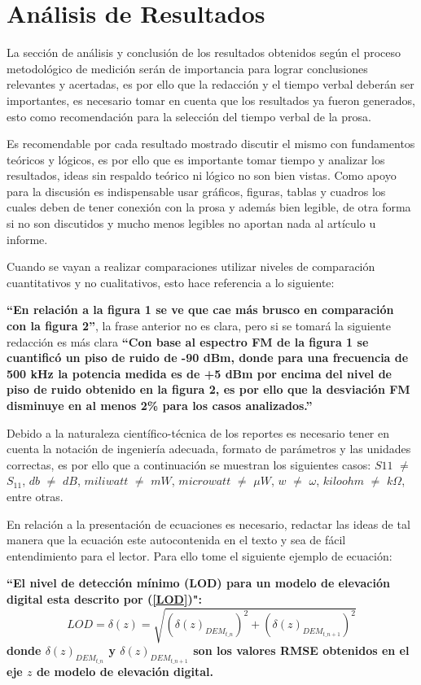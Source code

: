 \documentclass[conference]{IEEEtran}
\begin{document}
\section{Análisis de Resultados}
La sección de análisis y conclusión de los resultados obtenidos según el proceso metodológico de medición serán de importancia para lograr conclusiones relevantes y acertadas, es por ello que la redacción y el tiempo verbal deberán ser importantes, es necesario tomar en cuenta que los resultados ya fueron generados, esto como recomendación para la selección del tiempo verbal de la prosa.

Es recomendable por cada resultado mostrado discutir el mismo con fundamentos teóricos y lógicos, es por ello que es importante tomar tiempo y analizar los resultados, ideas sin respaldo teórico ni lógico no son bien vistas. Como apoyo para la discusión es indispensable usar gráficos, figuras, tablas y cuadros los cuales deben de tener conexión con la prosa y además bien legible, de otra forma si no son discutidos y mucho menos legibles no aportan nada al artículo u informe.

Cuando se vayan a realizar comparaciones utilizar niveles de comparación cuantitativos y no cualitativos, esto hace referencia a lo siguiente:

\textbf{``En relación a la figura 1 se ve que cae más brusco en comparación con la figura 2''}, la frase anterior no es clara, pero si se tomará la siguiente redacción es más clara \textbf{``Con base al espectro FM de la figura 1 se cuantificó un piso de ruido de -90 dBm, donde para una frecuencia de 500 kHz la potencia medida es de +5 dBm por encima del nivel de piso de ruido obtenido en la figura 2, es por ello que la desviación FM disminuye en al menos 2\% para los casos analizados.''}

Debido a la naturaleza científico-técnica de los reportes es necesario tener en cuenta la notación de ingeniería adecuada, formato de parámetros y las unidades correctas, es por ello que a continuación se muestran los siguientes casos: $S11$ $\neq$ $S_{11}$, $db$ $\neq$ $dB$, $miliwatt$ $\neq$ $mW$, $microwatt$ $\neq$ $\mu W$, $w$ $\neq$ $\omega$, $kiloohm$ $\neq$ $k \Omega$, entre otras.

En relación a la presentación de ecuaciones es necesario, redactar las ideas de tal manera que la ecuación este autocontenida en el texto y sea de fácil entendimiento para el lector. Para ello tome el siguiente ejemplo de ecuación:

\textbf{``El nivel de detección mínimo (LOD) para un modelo de elevación digital esta descrito por (\ref{LOD})":}
\begin{equation}
    LOD=\delta (z) = \sqrt{(\delta (z)_{DEM_{t\_n}})^2 + (\delta (z)_{DEM_{t\_{n+1}}})^2}
    \label{LOD}
\end{equation}
\textbf{donde $\delta (z)_{DEM_{t\_n}}$ y $\delta (z)_{DEM_{t\_{n+1}}}$ son los valores RMSE obtenidos en el eje $z$ de modelo de elevación digital.}
\end{document}
